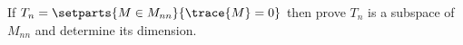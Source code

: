 If $T_{n}=\setparts{M \in M_{nn}}{\trace{M}=0}$ then prove $T_{n}$ is a subspace of $M_{nn}$ and determine its dimension.